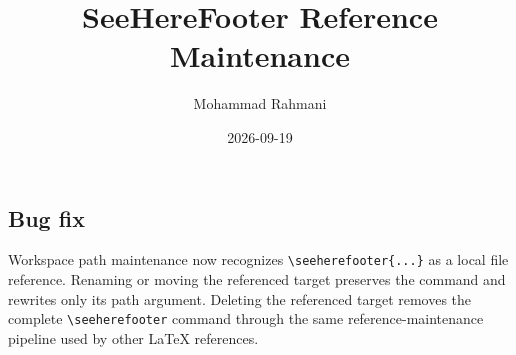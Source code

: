 \documentclass[a4paper]{article}
\title{SeeHereFooter Reference Maintenance}
\date{2026-09-19}
\author{Mohammad Rahmani}
\begin{document}
\maketitle
\begin{preview}
\section{Bug fix}
Workspace path maintenance now recognizes \texttt{\textbackslash seeherefooter\{...\}}
as a local file reference. Renaming or moving the referenced target preserves the
command and rewrites only its path argument. Deleting the referenced target removes
the complete \texttt{\textbackslash seeherefooter} command through the same
reference-maintenance pipeline used by other LaTeX references.
\end{preview}
\end{document}
